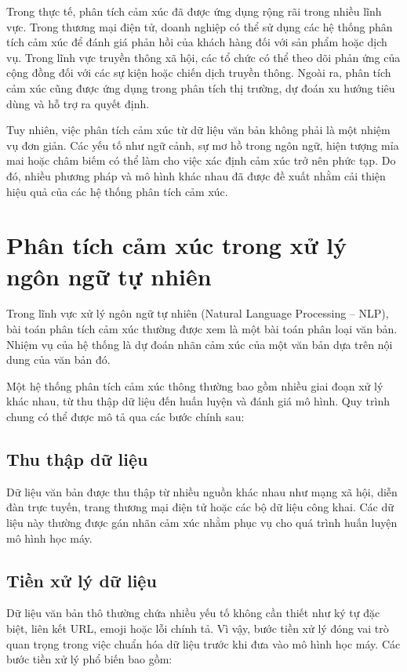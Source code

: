 \documentclass[14pt, a4paper]{report}
\begin{document}
Trong thực tế, phân tích cảm xúc đã được ứng dụng rộng rãi trong nhiều lĩnh vực. Trong thương mại điện tử, doanh nghiệp có thể sử dụng các hệ thống phân tích cảm xúc để đánh giá phản hồi của khách hàng đối với sản phẩm hoặc dịch vụ. Trong lĩnh vực truyền thông xã hội, các tổ chức có thể theo dõi phản ứng của cộng đồng đối với các sự kiện hoặc chiến dịch truyền thông. Ngoài ra, phân tích cảm xúc cũng được ứng dụng trong phân tích thị trường, dự đoán xu hướng tiêu dùng và hỗ trợ ra quyết định.

Tuy nhiên, việc phân tích cảm xúc từ dữ liệu văn bản không phải là một nhiệm vụ đơn giản. Các yếu tố như ngữ cảnh, sự mơ hồ trong ngôn ngữ, hiện tượng mỉa mai hoặc châm biếm có thể làm cho việc xác định cảm xúc trở nên phức tạp. Do đó, nhiều phương pháp và mô hình khác nhau đã được đề xuất nhằm cải thiện hiệu quả của các hệ thống phân tích cảm xúc.

\section{Phân tích cảm xúc trong xử lý ngôn ngữ tự nhiên}

Trong lĩnh vực xử lý ngôn ngữ tự nhiên (Natural Language Processing -- NLP), bài toán phân tích cảm xúc thường được xem là một bài toán phân loại văn bản. Nhiệm vụ của hệ thống là dự đoán nhãn cảm xúc của một văn bản dựa trên nội dung của văn bản đó.

Một hệ thống phân tích cảm xúc thông thường bao gồm nhiều giai đoạn xử lý khác nhau, từ thu thập dữ liệu đến huấn luyện và đánh giá mô hình. Quy trình chung có thể được mô tả qua các bước chính sau:

\subsection{Thu thập dữ liệu}

Dữ liệu văn bản được thu thập từ nhiều nguồn khác nhau như mạng xã hội, diễn đàn trực tuyến, trang thương mại điện tử hoặc các bộ dữ liệu công khai. Các dữ liệu này thường được gán nhãn cảm xúc nhằm phục vụ cho quá trình huấn luyện mô hình học máy.

\subsection{Tiền xử lý dữ liệu}

Dữ liệu văn bản thô thường chứa nhiều yếu tố không cần thiết như ký tự đặc biệt, liên kết URL, emoji hoặc lỗi chính tả. Vì vậy, bước tiền xử lý đóng vai trò quan trọng trong việc chuẩn hóa dữ liệu trước khi đưa vào mô hình học máy. Các bước tiền xử lý phổ biến bao gồm:
\end{document}
